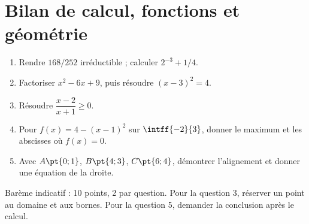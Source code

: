 \section{Bilan de calcul, fonctions et géométrie}
\begin{example}\begin{enumerate}
\item Rendre $168/252$ irréductible ; calculer $2^{-3}+1/4$.
\item Factoriser $x^2-6x+9$, puis résoudre $(x-3)^2=4$.
\item Résoudre $\dfrac{x-2}{x+1}\geq0$.
\item Pour $f(x)=4-(x-1)^2$ sur $\intff{-2}{3}$, donner le maximum et les abscisses où $f(x)=0$.
\item Avec $A\pt{0;1}$, $B\pt{4;3}$, $C\pt{6;4}$, démontrer l'alignement et donner une équation de la droite.
\end{enumerate}\end{example}
\begin{teachernote}Barème indicatif : 10 points, 2 par question. Pour la question 3, réserver un point au domaine et aux bornes. Pour la question 5, demander la conclusion après le calcul.\end{teachernote}

